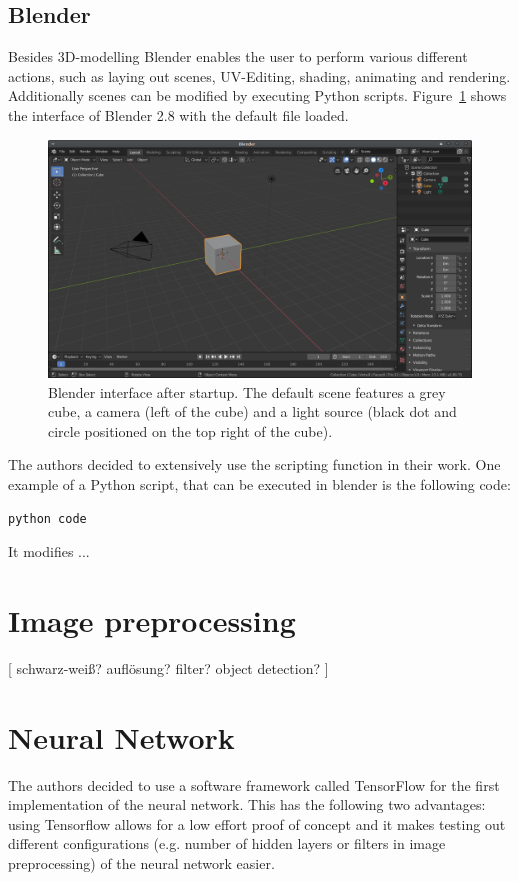 \subsection{Blender}
Besides 3D-modelling Blender enables the user to perform various different actions, such as laying out scenes, UV-Editing, shading, animating and rendering. Additionally scenes can be modified by executing Python scripts. Figure~\ref{pic:methodology_generatingData_blender_startscreen} shows the interface of Blender 2.8 with the default file loaded.

\begin{figure}[h!]
	\centering
	\includegraphics[width=6.5in]{img/methodology_generatingData_blender_startscreen.png}
	\caption{Blender interface after startup. The default scene features a grey cube, a camera (left of the cube) and a light source (black dot and circle positioned on the top right of the cube).}
	\label{pic:methodology_generatingData_blender_startscreen}
\end{figure}

The authors decided to extensively use the scripting function in their work. One example of a Python script, that can be executed in blender is the following code:

\begin{lstlisting}[language=python]
python code
\end{lstlisting}

It modifies ...

\section{Image preprocessing}


[
schwarz-weiß?
auflösung?
filter?
object detection?
]

\section{Neural Network}
The authors decided to use a software framework called TensorFlow for the first implementation of the neural network. This has the following two advantages: using Tensorflow allows for a low effort proof of concept and it makes testing out different configurations (e.g. number of hidden layers or filters in image preprocessing) of the neural network easier.

